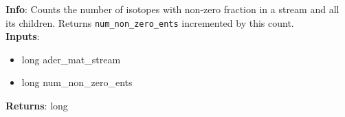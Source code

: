 \textbf{Info}: Counts the number of isotopes with non-zero fraction in a stream
and all its children. Returns \texttt{num\_non\_zero\_ents} incremented by this
count.\\

\noindent \textbf{Inputs}:
\begin{itemize}
\item{long ader\_mat\_stream}
\item{long num\_non\_zero\_ents}
\end{itemize}

\noindent \textbf{Returns}: long
